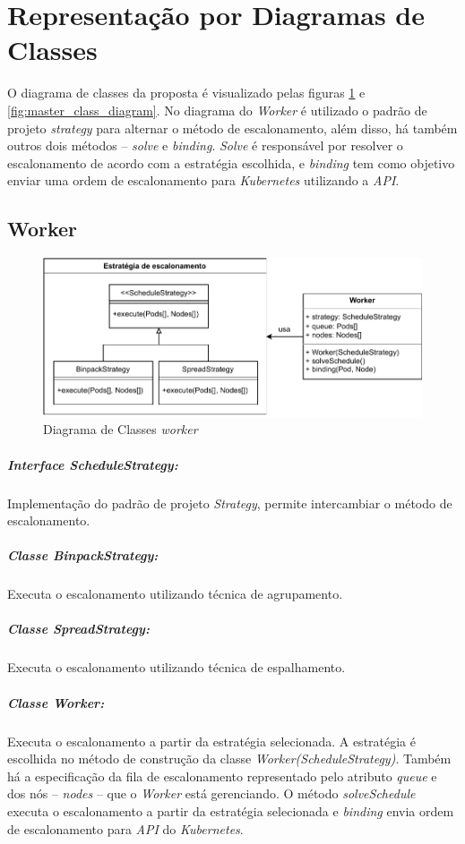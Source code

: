 \documentclass[
	12pt,				%
	openright,			%
	oneside,			%
	a4paper,			%
	brazil				%
	]{abntex2}
\begin{document}
\newpage
\section{Representação por Diagramas de Classes}

O diagrama de classes da proposta é visualizado pelas figuras \ref{fig:worker_class_diagram} e \ref{fig:master_class_diagram}. No diagrama do \textit{Worker} é utilizado o padrão de projeto \textit{strategy} para alternar o método de escalonamento, além disso, há também outros dois métodos -- \textit{solve} e \textit{binding}. \textit{Solve} é responsável por resolver o escalonamento de acordo com a estratégia escolhida, e \textit{binding} tem como objetivo enviar uma ordem de escalonamento para \textit{Kubernetes} utilizando a \textit{API}.

\subsection{Worker}
\begin{figure}[h!]
	\caption{\label{fig:worker_class_diagram}Diagrama de Classes \textit{worker}}
	\centering
	\includegraphics[width=1\linewidth]{assets/worker-class-diagram.pdf}
\end{figure}

\subparagraph{Interface \textit{ScheduleStrategy}:}
Implementação do padrão de projeto \textit{Strategy}, permite intercambiar o método de escalonamento.

\subparagraph{Classe \textit{BinpackStrategy}:}
Executa o escalonamento utilizando técnica de agrupamento.

\subparagraph{Classe \textit{SpreadStrategy}:}
Executa o escalonamento utilizando técnica de espalhamento.

\subparagraph{Classe \textit{Worker}:}
Executa o escalonamento a partir da estratégia selecionada. A estratégia é escolhida no método de construção da classe \textit{Worker(ScheduleStrategy)}. Também há a especificação da fila de escalonamento representado pelo atributo \textit{queue} e dos nós -- \textit{nodes} -- que o \textit{Worker} está gerenciando. O método \textit{solveSchedule} executa o escalonamento a partir da estratégia selecionada e \textit{binding} envia ordem de escalonamento para \textit{API} do \textit{Kubernetes}.
\end{document}
